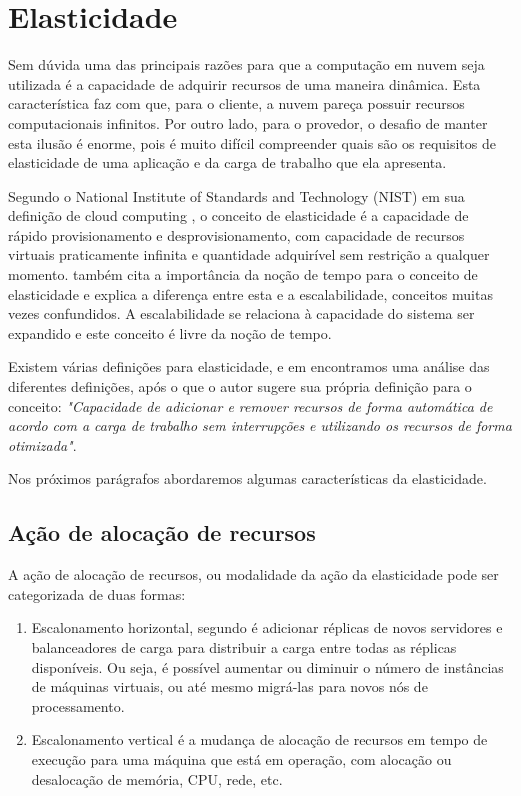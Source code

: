 \documentclass[twoside,english,brazilian]{UNISINOSmonografia}
\begin{document}
\section{Elasticidade}

Sem dúvida uma das principais razões para que a computação em nuvem seja utilizada é a capacidade de adquirir recursos de uma maneira dinâmica. Esta característica faz com que, para o cliente, a nuvem pareça possuir recursos computacionais infinitos. Por outro lado, para o provedor, o desafio de manter esta ilusão é enorme, pois é muito difícil compreender quais são os requisitos de elasticidade de uma aplicação e da carga de trabalho que ela apresenta.

Segundo o National Institute of Standards and Technology (NIST) em sua definição de cloud computing \cite{Mell2012}, o conceito de elasticidade é a capacidade de rápido provisionamento e desprovisionamento, com capacidade de recursos virtuais praticamente infinita e quantidade adquirível sem restrição a qualquer momento. \citep{Righi2013} também cita a importância da noção de tempo para o conceito de elasticidade e explica a diferença entre esta e a escalabilidade, conceitos muitas vezes confundidos. A escalabilidade se relaciona à capacidade do sistema ser expandido e este conceito é livre da noção de tempo.

Existem várias definições para elasticidade, e em \citep{Coutinho} encontramos uma análise das diferentes definições, após o que o autor sugere sua própria definição para o conceito: \textit{"Capacidade de adicionar e remover recursos de forma automática de acordo com a carga de trabalho sem interrupções e utilizando os recursos de forma otimizada"}.

Nos próximos parágrafos abordaremos algumas características da elasticidade.

\subsection{Ação de alocação de recursos}
A ação de alocação de recursos, ou modalidade da ação da elasticidade pode ser categorizada de duas formas: 

\begin{enumerate}
	\item Escalonamento horizontal, segundo \cite{Lorido-botr2012} é adicionar réplicas de novos servidores e balanceadores de carga para distribuir a carga entre todas as réplicas disponíveis. Ou seja, é possível aumentar ou diminuir o número de instâncias de máquinas virtuais, ou até mesmo migrá-las para novos nós de processamento.
	\item Escalonamento vertical é a mudança de alocação de recursos em tempo de execução para uma máquina que está em operação, com alocação ou desalocação de memória, CPU, rede, etc.
\end{enumerate}
\end{document}
